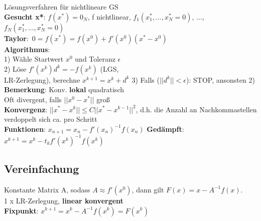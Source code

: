 Lösungsverfahren für nichtlineare GS\\
\textbf{Gesucht x*}: $f(x^*) = 0_N$, f nichtlinear,
$f_1(x_1^*, ..., x_N^* = 0)$, ..., $f_N(x_1^*, ..., x_N^* = 0)$\\
\mbox{\textbf{Taylor}: $0 = f(x^*) = f(x^0) + f'(x^0)(x^* - x^0)$}\\
\textbf{Algorithmus}:\\
1) Wähle Startwert $x^0$ und Toleranz $\epsilon$\\
2) Löse $f'(x^k)d^k = -f(x^k)$ (LGS,\\ LR-Zerlegung), berechne $x^{k+1} = x^k + d^k$
3) Falls ($||d^k|| < \epsilon$): STOP, ansonsten 2)\\
\textbf{Bemerkung}: Konv. \textbf{lokal} quadratisch\\
Oft divergent, falls $||x^0 - x^*||$ groß\\
\textbf{Konvergenz}: $||x^* - x^k|| \leq C||x^*-x^{k-1}||^2$, d.h. die Anzahl an Nachkommastellen verdoppelt sich ca. pro Schritt\\
\textbf{Funktionen}: $x_{n+1} = x_n - f'(x_n)^{-1}f(x_n)$
\textbf{Gedämpft}: 
$x^{k+1}=x^k-t_kf'(x^k)^{-1}f(x^{k})$
\subsection{Vereinfachung}
Konstante Matrix A, sodass $A \approx f'(x^0)$, dann gilt $F(x) = x - A^{-1}f(x)$.\\
1 x LR-Zerlegung, \textbf{linear konvergent}\\
\textbf{Fixpunkt}: $x^{k+1} = x^k-A^{-1}f(x^k) = F(x^k)$



